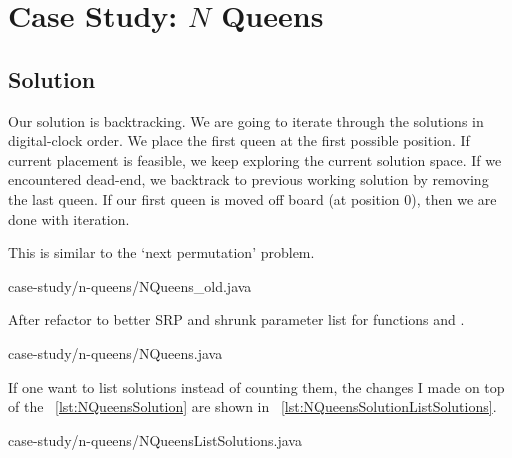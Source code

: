 
\chapter{Case Study: $N$ Queens}\label{ch:n-queens}

\section{Solution}
Our solution is backtracking.
We are going to iterate through the solutions in digital-clock order.
We place the first queen at the first possible position.
If current placement is feasible, we keep exploring the current solution space.
If we encountered dead-end, we backtrack to previous working solution by removing the last queen.
If our first queen is moved off board (at position 0), then we are done with iteration.

This is similar to the `next permutation' problem.



{case-study/n-queens/NQueens_old.java}

After refactor to better SRP and shrunk parameter list for functions  and
.


{case-study/n-queens/NQueens.java}

If one want to list solutions instead of counting them, the changes I made on top of the
~\autoref{lst:NQueensSolution} are shown in ~\autoref{lst:NQueensSolutionListSolutions}.


{case-study/n-queens/NQueensListSolutions.java}
